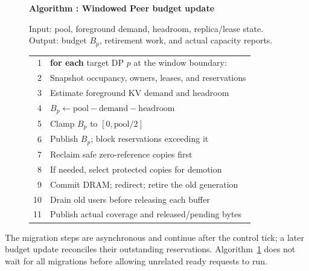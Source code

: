 \begin{figure}[t]
  \raggedright
  \label{alg:adapter}
  \noindent\textbf{Algorithm \thedesignalgorithm: Windowed Peer budget update}
  \par\smallskip
  \noindent Input: pool, foreground demand, headroom, replica/lease state.
  Output: budget $B_p$, retirement work, and actual capacity reports.
  \par\smallskip
  \begin{tabularx}{\columnwidth}{@{}r@{\quad}X@{}}
    \toprule
    1 & \textbf{for each} target DP $p$ at the window boundary: \\
    2 & \quad Snapshot occupancy, owners, leases, and reservations \\
    3 & \quad Estimate foreground KV demand and headroom \\
    4 & \quad$B_p\gets\mathrm{pool}-\mathrm{demand}-\mathrm{headroom}$ \\
    5 & \quad Clamp $B_p$ to $[0,\mathrm{pool}/2]$ \\
    6 & \quad Publish $B_p$; block reservations exceeding it \\
    7 & \quad Reclaim safe zero-reference copies first \\
    8 & \quad If needed, select protected copies for demotion \\
    9 & \quad Commit DRAM; redirect; retire the old generation \\
    10 & \quad Drain old users before releasing each buffer \\
    11 & \quad Publish actual coverage and released/pending bytes \\
    \bottomrule
  \end{tabularx}
\end{figure}

The migration steps are asynchronous and continue after the control tick;
a later budget update reconciles their outstanding reservations.
Algorithm~\ref{alg:adapter} does not wait for all migrations before allowing
unrelated ready requests to run.

